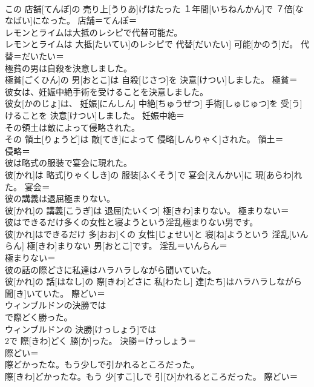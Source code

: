 \documentclass[8pt]{extreport}
\begin{document}
\begin{CJK}{UTF8}{min}
\\	この 店舗[てんぽ]の 売り上[うりあ]げはたった １年間[いちねんかん]で ７倍[ななばい]になった。	店舗＝てんぽ＝ 
\\	レモンとライムは大抵のレシピで代替可能だ。	
\\	レモンとライムは 大抵[たいてい]のレシピで 代替[だいたい] 可能[かのう]だ。	代替＝だいたい＝ 
\\	極貧の男は自殺を決意しました。	
\\	極貧[ごくひん]の 男[おとこ]は 自殺[じさつ]を 決意[けつい]しました。	極貧＝ 
\\	彼女は、妊娠中絶手術を受けることを決意しました。	
\\	彼女[かのじょ]は、 妊娠[にんしん] 中絶[ちゅうぜつ] 手術[しゅじゅつ]を 受[う]けることを 決意[けつい]しました。	妊娠中絶＝ 
\\	その領土は敵によって侵略された。	
\\	その 領土[りょうど]は 敵[てき]によって 侵略[しんりゃく]された。	領土＝ 
\\	侵略＝ 
\\	彼は略式の服装で宴会に現れた。	
\\	彼[かれ]は 略式[りゃくしき]の 服装[ふくそう]で 宴会[えんかい]に 現[あらわ]れた。	宴会＝ 
\\	彼の講義は退屈極まりない。	
\\	彼[かれ]の 講義[こうぎ]は 退屈[たいくつ] 極[きわ]まりない。	極まりない＝ 
\\	彼はできるだけ多くの女性と寝ようという淫乱極まりない男です。	
\\	彼[かれ]はできるだけ 多[おお]くの 女性[じょせい]と 寝[ね]ようという 淫乱[いんらん] 極[きわ]まりない 男[おとこ]です。	淫乱＝いんらん＝ 
\\	極まりない＝ 
\\	彼の話の際どさに私達はハラハラしながら聞いていた。	
\\	彼[かれ]の 話[はなし]の 際[きわ]どさに 私[わたし] 達[たち]はハラハラしながら 聞[き]いていた。	際どい＝ 
\\	ウィンブルドンの決勝では 
\\	で際どく勝った。	
\\	ウィンブルドンの 決勝[けっしょう]では 
\\	2で 際[きわ]どく 勝[か]った。	決勝＝けっしょう＝ 
\\	際どい＝ 
\\	際どかったな。もう少しで引かれるところだった。	
\\	際[きわ]どかったな。もう 少[すこ]しで 引[ひ]かれるところだった。	際どい＝ 

\end{CJK}
\end{document}
